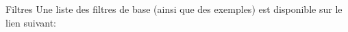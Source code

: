 \begin{frame}{Filtres}
	Une liste des filtres de base (ainsi que des exemples) est disponible sur le lien suivant:



\end{frame}
